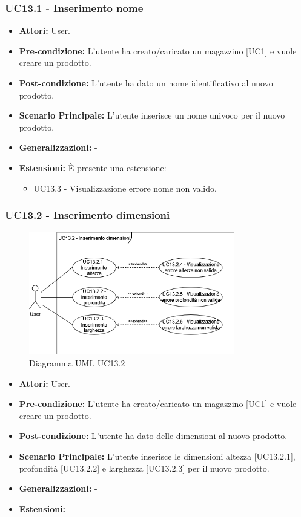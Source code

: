 \subsubsection{UC13.1 - Inserimento nome}
\begin{itemize}
    \item \textbf{Attori:} User.
    \item \textbf{Pre-condizione:}  L'utente ha creato/caricato un magazzino [UC1] e vuole creare un prodotto.
    \item \textbf{Post-condizione:} L'utente ha dato un nome identificativo al nuovo prodotto.
    \item \textbf{Scenario Principale:}  L'utente inserisce un nome univoco per il nuovo prodotto.
    \item \textbf{Generalizzazioni:} -
    \item \textbf{Estensioni:} È presente una estensione:
    \begin{itemize}
        \item UC13.3 - Visualizzazione errore nome non valido.
    \end{itemize}
\end{itemize}


\subsubsection{UC13.2 - Inserimento dimensioni}
\begin{figure}[H]
  \centering
  \includegraphics[width=0.8\textwidth]{UC_diagrams_11-20/UC13.2.drawio.png}
   \caption{Diagramma UML UC13.2}
\end{figure}
\begin{itemize}
    \item \textbf{Attori:} User.
    \item \textbf{Pre-condizione:}  L'utente ha creato/caricato un magazzino [UC1] e vuole creare un prodotto.
    \item \textbf{Post-condizione:} L'utente ha dato delle dimensioni al nuovo prodotto.
    \item \textbf{Scenario Principale:}  L'utente inserisce le dimensioni altezza [UC13.2.1], profondità [UC13.2.2] e larghezza [UC13.2.3] per il nuovo prodotto.
    \item \textbf{Generalizzazioni:} -
    \item \textbf{Estensioni:} -
\end{itemize}


